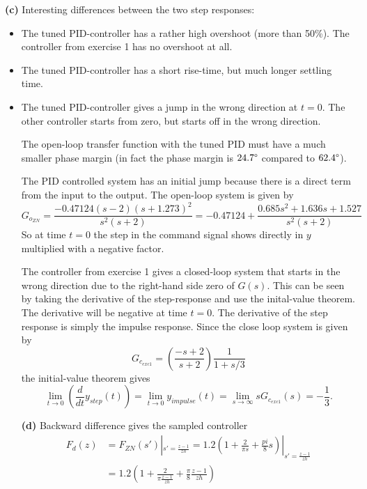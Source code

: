 \documentclass{scrartcl}
\begin{document}
   \textbf{(c)} Interesting differences between the two step responses:
\begin{itemize}
\item The tuned PID-controller has a rather high overshoot (more than 50\%). The controller from exercise 1 has no overshoot at all.
\item The tuned PID-controller has a short rise-time, but much longer settling time.
\item The tuned PID-controller gives a jump in the wrong direction at $t=0$. The other controller starts from zero, but starts off in the wrong direction.

     The open-loop transfer function with the tuned PID must have a much smaller phase margin (in fact the phase margin is $24.7\degree$ compared to $62.4\degree$). 

     The PID controlled system has an initial jump because there is a direct term from the input to the output. The open-loop system is given by
     \[ G_{o_{ZN}} = \frac{-0.47124 (s-2) (s+1.273)^2}{s^2 (s+2)} = -0.47124 + \frac{ 0.685s^2 + 1.636s + 1.527}{s^2 (s+2)} \]
     So at time $t=0$ the step in the command signal shows directly in $y$ multiplied with a negative factor. 

     The controller from exercise 1 gives a closed-loop system that starts in the wrong direction due to the right-hand side zero of $G(s)$. This can be seen by taking the derivative of the step-response and use the inital-value theorem. The derivative will be negative at time $t=0$. The derivative of the step response is simply the impulse response. Since the close loop system is given by
     \[ G_{c_{exc1}} = \left(\frac{-s+2}{s+2}\right)\frac{1}{1+s/3} \]
     the initial-value theorem gives
     \[ \lim_{t \to 0} \left(\frac{d}{dt} y_{step}(t)\right) = \lim_{t \to 0} y_{impulse}(t) = \lim_{s \to \infty} sG_{c_{exc1}}(s) = -\frac{1}{3}. \]

     \textbf{(d)} Backward difference gives the sampled controller 
     \begin{equation*}
       \begin{split}
        F_d(z) &= F_{ZN}(s')|_{s' = \frac{z-1}{zh}} =  1.2\left(1 + \frac{2}{\pi s} + \frac{pi}{8} s \right)|_{s' = \frac{z-1}{zh}}\\
               &= 1.2\left( 1 + \frac{2}{\pi \frac{z-1}{zh}} + \frac{\pi}{8} \frac{z-1}{zh}\right)
     \end{split}
     \end{equation*}
\end{itemize}

   
\end{document}
